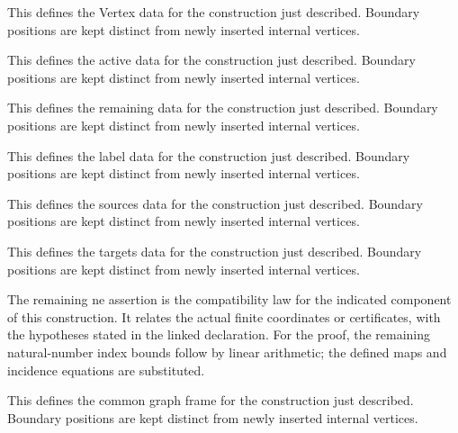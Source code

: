 This defines the Vertex data for the construction just described. Boundary positions are kept distinct from newly inserted internal vertices.
\par{}

This defines the active data for the construction just described. Boundary positions are kept distinct from newly inserted internal vertices.
\par{}

This defines the remaining data for the construction just described. Boundary positions are kept distinct from newly inserted internal vertices.
\par{}

This defines the label data for the construction just described. Boundary positions are kept distinct from newly inserted internal vertices.
\par{}

This defines the sources data for the construction just described. Boundary positions are kept distinct from newly inserted internal vertices.
\par{}

This defines the targets data for the construction just described. Boundary positions are kept distinct from newly inserted internal vertices.
\par{}

The remaining ne assertion is the compatibility law for the indicated component of this construction. It relates the actual finite coordinates or certificates, with the hypotheses stated in the linked declaration.
For the proof, the remaining natural-number index bounds follow by linear arithmetic; the defined maps and incidence equations are substituted.
\par{}

This defines the common graph frame for the construction just described. Boundary positions are kept distinct from newly inserted internal vertices.
\par{}

